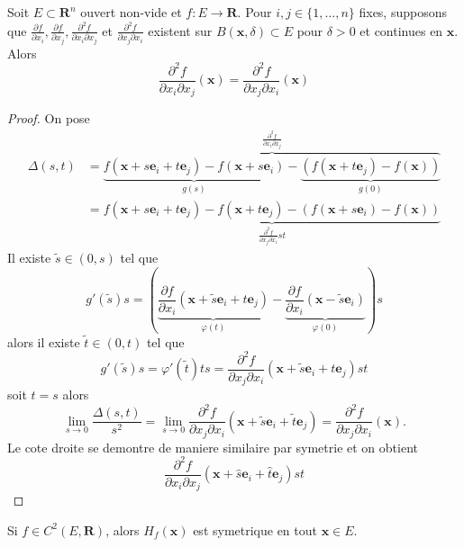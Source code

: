 \begin{theorem}
Soit $E\subset \mathbf{R}^{n}$ ouvert non-vide et $f:E\to \mathbf{R}$. Pour $i,j\in \{ 1,\dots,n \}$ fixes, supposons que $\frac{ \partial f }{ \partial x_{i} },\frac{ \partial f }{ \partial x_{j} },\frac{ \partial^{2}f }{ \partial x_{i}\partial x_{j} }$ et $\frac{ \partial^{2}f }{ \partial x_{j}\partial x_{i} }$ existent sur $B(\boldsymbol{x},\delta)\subset E$ pour $\delta>0$ et continues en $\boldsymbol{x}$. Alors
$$
\frac{ \partial^{2}f }{ \partial x_{i}\partial x_{j} }(\boldsymbol{x}) = \frac{ \partial^{2}f }{ \partial x_{j}\partial x_{i} } (\boldsymbol{x})
$$
\end{theorem}
\begin{proof}
On pose
\begin{align*}
\Delta(s,t) & =\overbrace{\underbrace{  f(\boldsymbol{x}+s\boldsymbol{e}_{i}+t\boldsymbol{e}_{j})-f(\boldsymbol{x}+s\boldsymbol{e}_{i}) }_{ g(s) }-\underbrace{ (f(\boldsymbol{x}+t\boldsymbol{e}_{j})-f(\boldsymbol{x})) }_{ g(0) }  }^{ \frac{ \partial^{2}f }{ \partial x_{i}\partial x_{j} }  }\\
 & =\underbrace{ f(\boldsymbol{x}+s\boldsymbol{e}_{i}+t\boldsymbol{e}_{j})-f(\boldsymbol{x}+t\boldsymbol{e}_{j})-(f(\boldsymbol{x}+s\boldsymbol{e}_{i})-f(\boldsymbol{x})) }_{ \frac{ \partial^{2}f }{ \partial x_{j}\partial x_{i} } st }
\end{align*}
Il existe $\tilde{s}\in(0,s)$ tel que 
$$
g'(\tilde{s})s=\left(\underbrace{  \frac{ \partial f }{ \partial x_{i} } (\boldsymbol{x}+\tilde{s}\boldsymbol{e}_{i}+t\boldsymbol{e}_{j}) }_{ \varphi(t) }-\underbrace{ \frac{ \partial f }{ \partial x_{i} } (\boldsymbol{x}-\tilde{s}\boldsymbol{e}_{i}) }_{ \varphi(0) } \right)s
$$
alors il existe $\tilde{t}\in(0,t)$ tel que 
$$
g'(\tilde{s})s=\varphi '(\tilde{t})ts=\frac{ \partial^{2}f }{ \partial x_{j}\partial x_{i} } (\boldsymbol{x}+\tilde{s}\boldsymbol{e}_{i}+t\boldsymbol{e}_{j})st
$$
soit $t=s$ alors
$$
\lim_{ s \to 0 } \frac{\Delta(s,t)}{s^{2}}=\lim_{ s \to 0 } \frac{ \partial^{2}f }{ \partial x_{j}\partial x_{i} }(\boldsymbol{x}+\tilde{s}\boldsymbol{e}_{i}+\tilde{t}\boldsymbol{e}_{j})=\frac{ \partial^{2}f }{ \partial x_{j}\partial x_{i} } (\boldsymbol{x}).
$$
Le cote droite se demontre de maniere similaire par symetrie et on obtient
$$
\frac{ \partial^{2}f }{ \partial x_{i}\partial x_{j} }(\boldsymbol{x}+\hat{s}\boldsymbol{e}_{i}+\hat{t}\boldsymbol{e}_{j})st 
$$
\end{proof}
\begin{corollary}
Si $f\in C^{2}(E,\mathbf{R})$, alors $H_{f}(\boldsymbol{x})$ est symetrique en tout $\boldsymbol{x}\in E$.
\end{corollary}